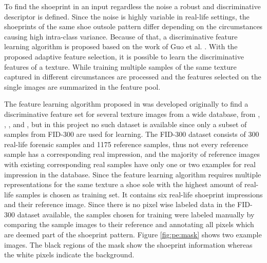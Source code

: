 \documentclass[draft,final]{vutinfth} %
\begin{document}
\par
To find the shoeprint in an input regardless the noise a robust and discriminative descriptor is defined.
Since the noise is highly variable in real-life settings, the shoeprints of the same shoe outsole  pattern differ depending on the circumstances causing high intra-class variance.
Because of that, a discriminative feature learning algorithm is proposed based on the work of Guo et al. \cite{guo2012discriminative}.
With the proposed adaptive feature selection, it is possible to learn the discriminative features of a texture.%
While training multiple samples of the same texture captured in different circumstances are processed and the features selected on the single images are summarized in the feature pool.
\par
The feature learning algorithm proposed in \cite{guo2012discriminative} was developed originally to find a discriminative feature set for several texture images from a wide database, from \cite{ojala2002outex}, \cite{dana1999reflectance}, \cite{boland2001neural}, \cite{jantzen2005pap} and \cite{brahnam2007introduction}, but in this project no such dataset is available since only a subset of samples from FID-300 are used for learning. 
The FID-300 \cite{kortylewski2014unsupervised} dataset consists of 300 real-life forensic samples and 1175 reference samples, thus not every reference sample has a corresponding real impression, and the majority of reference images with existing corresponding real samples have only one or two examples for real impression in the database.
Since the feature learning algorithm requires multiple representations for the same texture a shoe sole with the highest amount of real-life samples is chosen as training set.
It contains six real-life shoeprint impressions and their reference image. 
Since there is no pixel wise labeled data in the FID-300 dataset available, the samples chosen for training were labeled manually by comparing the sample images to their reference and annotating all pixels which are deemed part of the shoeprint pattern.
Figure \ref{fig:pe:mask} shows two example images. 
The black regions of the mask show the shoeprint information whereas the white pixels indicate the background.
\end{document}
